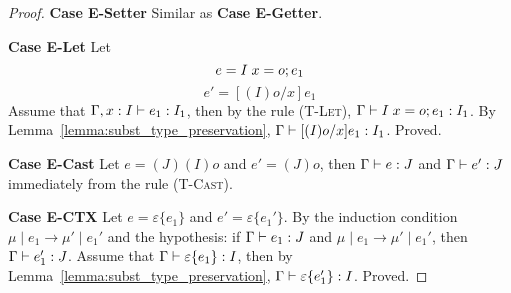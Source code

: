\begin{proof}
\indent \textbf{Case E-Setter}
Similar as \textbf{Case E-Getter}.

\indent \textbf{Case E-Let} Let
$$e = I \; x = o;e_1$$
$$e' = [(I)o/x]e_1$$
Assume that $\Gamma, x : I \; {\vdash} \; e_1 : I_1$, then by the rule \textsc{(T-Let)}, $\Gamma \; {\vdash} \; I \; x = o;e_1 : I_1$.
By Lemma~\ref{lemma:subst_type_preservation}, $\Gamma \; {\vdash} \; [(I)o/x]e_1 : I_1$. Proved.

\indent \textbf{Case E-Cast} 
Let $e = (J)(I)o$ and $e' = (J)o$, then $\Gamma \; {\vdash} \; e : J$ and $\Gamma \; {\vdash} \; e' : J$ immediately from the rule \textsc{(T-Cast)}.

\indent \textbf{Case E-CTX}
Let $e = \varepsilon\{e_1\}$ and $e' = \varepsilon\{e_1'\}$.
By the induction condition $\mu \mid e_1 \to \mu' \mid e_1'$ and the hypothesis:
if $\Gamma \; {\vdash} \; e_1:J$ and $\mu \mid e_1 \to \mu' \mid e_1'$, then 
$\Gamma \; {\vdash} \; e_1' : J$. Assume that $\Gamma \; {\vdash} \; \varepsilon\{e_1\} : I$, then by Lemma~\ref{lemma:subst_type_preservation}, 
$\Gamma \; {\vdash} \; \varepsilon\{e_1'\} : I$. Proved.
\end{proof}

